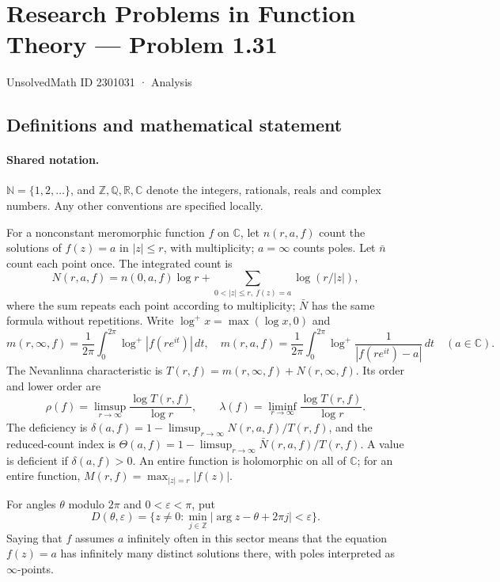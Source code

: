 \documentclass[11pt]{article}
\begin{document}
\setcounter{section}{2301030}
\section{Research Problems in Function Theory — Problem 1.31}\label{2301031}
{\small\sffamily UnsolvedMath ID 2301031 · Analysis}
\subsection{Definitions and mathematical statement}

\paragraph{Shared notation.}$\mathbb N=\{1,2,\ldots\}$, and $\mathbb Z,\mathbb Q,\mathbb R,\mathbb C$ denote the integers, rationals, reals and complex numbers. Any other conventions are specified locally.


For a nonconstant meromorphic function $f$ on $\mathbb C$, let $n(r,a,f)$ count the solutions of $f(z)=a$ in $|z|\le r$, with multiplicity; $a=\infty$ counts poles. Let $\bar n$ count each point once. The integrated count is
\[
 N(r,a,f)=n(0,a,f)\log r+\sum_{0<|z|\le r,\ f(z)=a}\log(r/|z|),
\]
where the sum repeats each point according to multiplicity; $\bar N$ has the same formula without repetitions. Write $\log^+x=\max(\log x,0)$ and
\[
 m(r,\infty,f)=\frac1{2\pi}\int_0^{2\pi}\log^+|f(re^{it})|\,dt,\quad
 m(r,a,f)=\frac1{2\pi}\int_0^{2\pi}\log^+\frac1{|f(re^{it})-a|}\,dt\quad(a\in\mathbb C).
\]
The Nevanlinna characteristic is $T(r,f)=m(r,\infty,f)+N(r,\infty,f)$. Its order and lower order are
\[
 \rho(f)=\limsup_{r\to\infty}\frac{\log T(r,f)}{\log r},\qquad
 \lambda(f)=\liminf_{r\to\infty}\frac{\log T(r,f)}{\log r}.
\]
The deficiency is $\delta(a,f)=1-\limsup_{r\to\infty}N(r,a,f)/T(r,f)$, and the reduced-count index is $\Theta(a,f)=1-\limsup_{r\to\infty}\bar N(r,a,f)/T(r,f)$. A value is deficient if $\delta(a,f)>0$. An entire function is holomorphic on all of $\mathbb C$; for an entire function, $M(r,f)=\max_{|z|=r}|f(z)|$.

For angles $\theta$ modulo $2\pi$ and $0<\varepsilon<\pi$, put
\[
 D(\theta,\varepsilon)=\{z\ne0:\min_{j\in\mathbb Z}|\arg z-\theta+2\pi j|<\varepsilon\}.
\]
Saying that $f$ assumes $a$ infinitely often in this sector means that the equation $f(z)=a$ has infinitely many distinct solutions there, with poles interpreted as $\infty$-points.
\end{document}
